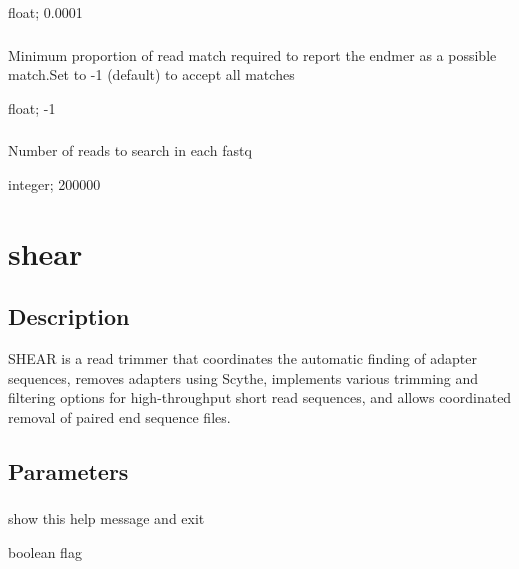 \documentclass[letterpaper,11pt,english]{sphinxmanual}
\begin{document}
 float;  0.0001


\subsubsection{}
\label{\detokenize{prog_desc:m-known-min-match}}
 Minimum proportion of read match required to report the endmer as a possible match.Set to -1 (default) to accept all matches

 float;  -1


\subsubsection{}
\label{\detokenize{prog_desc:n-number-of-reads}}
 Number of reads to search in each fastq

 integer;  200000


\section{shear}
\label{\detokenize{prog_desc:shear}}

\subsection{Description}
\label{\detokenize{prog_desc:id1}}
SHEAR is a read trimmer that coordinates the automatic
finding of adapter sequences, removes adapters using Scythe,
implements various trimming and filtering options
for high-throughput short read sequences, and allows coordinated
removal of paired end sequence files.


\subsection{Parameters}
\label{\detokenize{prog_desc:id2}}

\subsubsection{}
\label{\detokenize{prog_desc:id3}}
 show this help message and exit

 boolean flag
\end{document}
